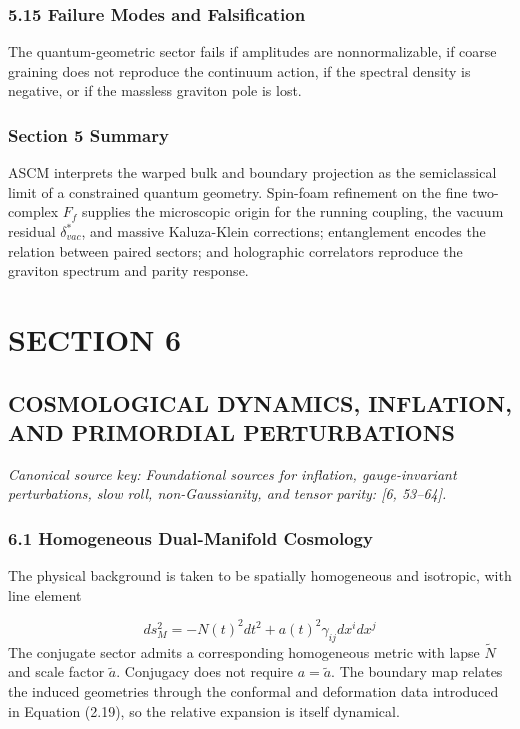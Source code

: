 \documentclass[aps,prd,onecolumn,superscriptaddress,nofootinbib,longbibliography,10pt]{revtex4-2}
\begin{document}
  
\subsubsection*{5.15 Failure Modes and Falsification}

  The quantum-geometric sector fails if amplitudes are nonnormalizable, if coarse graining does not reproduce the continuum action, if the spectral density is negative, or if the massless graviton pole is lost.


  
\subsubsection*{Section 5 Summary}

  ASCM interprets the warped bulk and boundary projection as the semiclassical limit of a constrained quantum geometry. Spin-foam refinement on the fine two-complex \(F_f\) supplies the microscopic origin for the running coupling, the vacuum residual \(\delta_{vac}^*\), and massive Kaluza-Klein corrections; entanglement encodes the relation between paired sectors; and holographic correlators reproduce the graviton spectrum and parity response.




 

  
\section*{SECTION 6}

  
\subsection*{COSMOLOGICAL DYNAMICS, INFLATION, AND PRIMORDIAL PERTURBATIONS}

  \textit{Canonical source key: Foundational sources for inflation, gauge-invariant perturbations, slow roll, non-Gaussianity, and tensor parity: [6, 53–64].}


  
\subsubsection*{6.1 Homogeneous Dual-Manifold Cosmology}

  The physical background is taken to be spatially homogeneous and isotropic, with line element


  \[ ds_M^2 = -N(t)^2 dt^2 + a(t)^2 \gamma_{ij} dx^i dx^j \]
  The conjugate sector admits a corresponding homogeneous metric with lapse \(\tilde{N}\) and scale factor \(\tilde{a}\). Conjugacy does not require \(a = \tilde{a}\). The boundary map relates the induced geometries through the conformal and deformation data introduced in Equation (2.19), so the relative expansion is itself dynamical.
\end{document}
